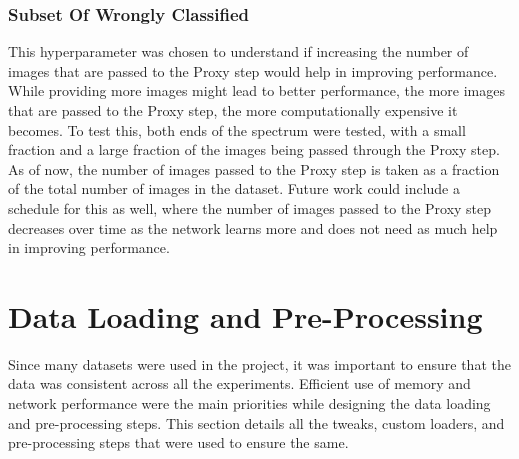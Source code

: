 \subsubsection{Subset Of Wrongly Classified}
This hyperparameter was chosen to understand if increasing the number of images that are passed to the Proxy step would help in improving performance. While providing more images might lead to better performance, the more images that are passed to the Proxy step, the more computationally expensive it becomes. To test this, both ends of the spectrum were tested, with a small fraction and a large fraction of the images being passed through the Proxy step.\\
As of now, the number of images passed to the Proxy step is taken as a fraction of the total number of images in the dataset. Future work could include a schedule for this as well, where the number of images passed to the Proxy step decreases over time as the network learns more and does not need as much help in improving performance.

\section{Data Loading and Pre-Processing}
Since many datasets were used in the project, it was important to ensure that the data was consistent across all the experiments.  Efficient use of memory and network performance were the main priorities while designing the data loading and pre-processing steps. This section details all the tweaks, custom loaders, and pre-processing steps that were used to ensure the same.

